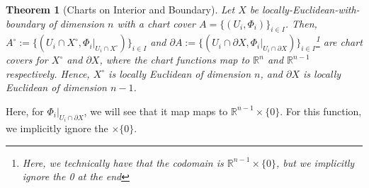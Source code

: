 \documentclass{article}
\newcommand{\R}{\mathbb{R}}
\newcommand{\bdr}{\partial}
\theoremstyle{plain} %
\newtheorem{thm}{Theorem}
\numberwithin{thm}{section} %
\theoremstyle{definition} %
\begin{document}
\begin{thm}[Charts on Interior and Boundary]
    \label{chartintbdr}
    Let $X$ be locally-Euclidean-with-boundary of dimension $n$ with a chart cover $A = \{(U_i, \Phi_i)\}_{i \in I}$. Then, $A^\circ := \{(U_i \cap X^\circ, \Phi_i|_{U_i \cap X^\circ})\}_{i \in I}$ and $\bdr A := \{(U_i \cap \bdr X, \Phi_i|_{U_i \cap \bdr X})\}_{i \in I}$\footnote{Here, we technically have that the codomain is $\R^{n - 1} \times \{0\}$, but we implicitly ignore the 0 at the end} are chart covers for $X^\circ$ and $\bdr X$, where the chart functions map to $\R^n$ and $\R^{n - 1}$ respectively. Hence, $X^\circ$ is locally Euclidean of dimension $n$, and $\bdr X$ is locally Euclidean of dimension $n - 1$.
\end{thm}

Here, for $\Phi_i|_{U_i \cap \bdr X}$, we will see that it map maps to $\R^{n - 1} \times \{0\}$. For this function, we implicitly ignore the $\times \{0\}$.
\end{document}
